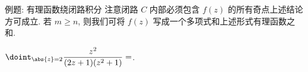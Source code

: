 \begin{frame}{例题: 有理函数绕闭路积分}
	\onslide<+->
	注意闭路 $C$ 内部必须包含 $f(z)$ 的所有奇点上述结论方可成立.
	\onslide<+->
	若 $m\ge n$, 则我们可将 $f(z)$ 写成一个多项式和上述形式有理函数之和.
	\onslide<+->
	\begin{exercise}
		$\doint_{\abs{z}=2}\dfrac{z^2}{(2z+1)(z^2+1)}=$\fillblankframe{$\pi\ii$}.
	\end{exercise}
\end{frame}